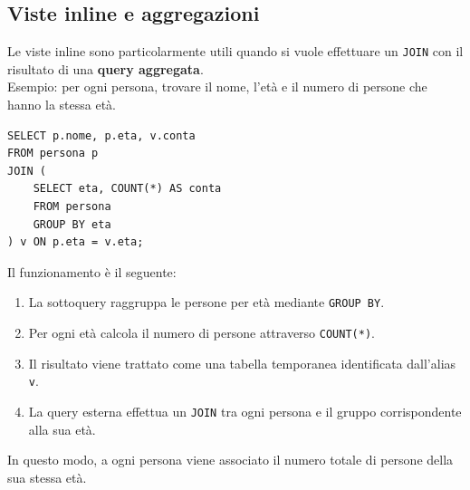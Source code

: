 \subsection{Viste inline e aggregazioni}
Le viste inline sono particolarmente utili quando
si vuole effettuare un \texttt{JOIN} con il risultato
di una \textbf{query aggregata}.\\
\textcolor{verdeEsempio}{Esempio:} per ogni persona, trovare il nome,
l'età e il numero di persone che hanno la stessa età.
\begin{verbatim}
SELECT p.nome, p.eta, v.conta
FROM persona p
JOIN (
    SELECT eta, COUNT(*) AS conta
    FROM persona
    GROUP BY eta
) v ON p.eta = v.eta;
\end{verbatim}
Il funzionamento è il seguente:
\begin{enumerate}
    \item La sottoquery raggruppa le persone per età
    mediante \texttt{GROUP BY}.
    
    \item Per ogni età calcola il numero di persone
    attraverso \texttt{COUNT(*)}.
    
    \item Il risultato viene trattato come una tabella
    temporanea identificata dall'alias \texttt{v}.
    
    \item La query esterna effettua un \texttt{JOIN}
    tra ogni persona e il gruppo corrispondente
    alla sua età.
\end{enumerate}
In questo modo, a ogni persona viene associato
il numero totale di persone della sua stessa età.

